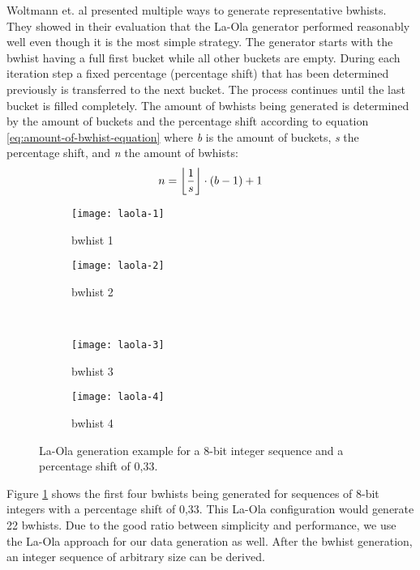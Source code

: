 Woltmann et. al \cite{Woltmann2021} presented multiple ways to generate representative bwhists. They showed in their evaluation that the La-Ola generator performed reasonably well even though it is the most simple strategy. The generator starts with the bwhist having a full first bucket while all other buckets are empty. 
During each iteration step a fixed percentage (percentage shift) that has been determined previously is transferred to the next bucket. The process continues until the last bucket is filled completely. The amount of bwhists being generated is determined by the amount of buckets and the percentage shift according to equation \ref{eq:amount-of-bwhist-equation} where \emph{b} is the amount of buckets, \emph{s} the percentage shift, and \emph{n} the amount of bwhists:\\
\begin{equation} \label{eq:amount-of-bwhist-equation}
    n = \floor*{\frac{1}{s}} \cdot (b-1) + 1 
\end{equation}
\begin{figure}[h]
    \centering
    \begin{subfigure}{.5\textwidth}
      \centering
      \texttt{[image: laola-1]}
      \caption{bwhist 1}
    \end{subfigure}%
    \begin{subfigure}{.5\textwidth}
      \centering
      \texttt{[image: laola-2]}
      \caption{bwhist 2}
    \end{subfigure}%
    \\
    \begin{subfigure}{.5\textwidth}
      \centering
      \texttt{[image: laola-3]}
      \caption{bwhist 3}
    \end{subfigure}%
    \begin{subfigure}{.5\textwidth}
      \centering
      \texttt{[image: laola-4]}
      \caption{bwhist 4}
    \end{subfigure}%
    \caption{La-Ola generation example for a 8-bit integer sequence and a percentage shift of 0,33.}
    \label{fig:laola-example}
\end{figure}

Figure \ref{fig:laola-example} shows the first four bwhists being generated for sequences of 8-bit integers with a percentage shift of 0,33. This La-Ola configuration would generate 22 bwhists. Due to the good ratio between simplicity and performance, we use the La-Ola approach for our data generation as well. After the bwhist generation, an integer sequence of arbitrary size can be derived.

